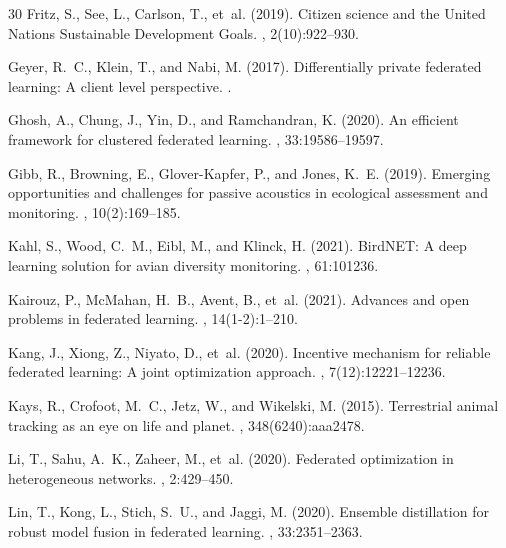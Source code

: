 \documentclass[11pt,a4paper]{article}
\begin{document}
\begin{thebibliography}{30}
Fritz, S., See, L., Carlson, T., et~al. (2019).
\newblock Citizen science and the United Nations Sustainable Development Goals.
, 2(10):922--930.

Geyer, R.~C., Klein, T., and Nabi, M. (2017).
\newblock Differentially private federated learning: A client level perspective.
.

Ghosh, A., Chung, J., Yin, D., and Ramchandran, K. (2020).
\newblock An efficient framework for clustered federated learning.
, 33:19586--19597.

Gibb, R., Browning, E., Glover-Kapfer, P., and Jones, K.~E. (2019).
\newblock Emerging opportunities and challenges for passive acoustics in ecological assessment and monitoring.
, 10(2):169--185.

Kahl, S., Wood, C.~M., Eibl, M., and Klinck, H. (2021).
\newblock BirdNET: A deep learning solution for avian diversity monitoring.
, 61:101236.

Kairouz, P., McMahan, H.~B., Avent, B., et~al. (2021).
\newblock Advances and open problems in federated learning.
, 14(1-2):1--210.

Kang, J., Xiong, Z., Niyato, D., et~al. (2020).
\newblock Incentive mechanism for reliable federated learning: A joint optimization approach.
, 7(12):12221--12236.

Kays, R., Crofoot, M.~C., Jetz, W., and Wikelski, M. (2015).
\newblock Terrestrial animal tracking as an eye on life and planet.
, 348(6240):aaa2478.

Li, T., Sahu, A.~K., Zaheer, M., et~al. (2020).
\newblock Federated optimization in heterogeneous networks.
, 2:429--450.

Lin, T., Kong, L., Stich, S.~U., and Jaggi, M. (2020).
\newblock Ensemble distillation for robust model fusion in federated learning.
, 33:2351--2363.


\end{thebibliography}
\end{document}
